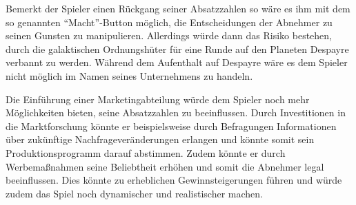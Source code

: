 Bemerkt der Spieler einen Rückgang seiner Absatzzahlen so wäre es ihm mit dem so genannten “Macht”-Button möglich, die Entscheidungen der Abnehmer zu seinen Gunsten zu manipulieren. Allerdings würde dann das Risiko bestehen, durch die galaktischen Ordnungshüter für eine Runde auf den Planeten Despayre verbannt zu werden. Während dem Aufenthalt auf Despayre wäre es dem Spieler nicht möglich im Namen seines Unternehmens zu handeln. 

Die Einführung einer Marketingabteilung würde dem Spieler noch mehr Möglichkeiten bieten, seine Absatzzahlen zu beeinflussen. Durch Investitionen in die Marktforschung könnte er beispielsweise durch Befragungen Informationen über zukünftige Nachfrageveränderungen erlangen und könnte somit sein Produktionsprogramm darauf abstimmen. Zudem könnte er durch Werbemaßnahmen seine Beliebtheit erhöhen und somit die Abnehmer legal beeinflussen. Dies könnte zu erheblichen Gewinnsteigerungen führen und würde zudem das Spiel noch dynamischer und realistischer machen.